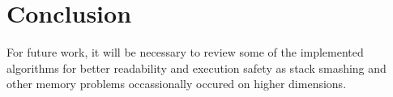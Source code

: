 \chapter{Conclusion}
For future work, it will be necessary to review some of the implemented algorithms for better readability and execution safety as 
stack smashing and other memory problems occassionally occured on higher dimensions.